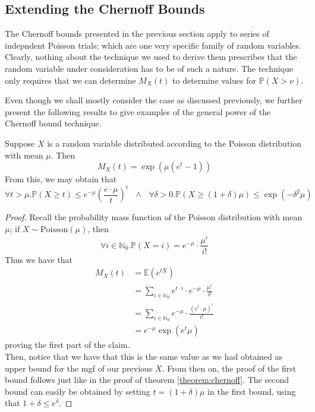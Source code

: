 	\subsection{Extending the Chernoff Bounds}
	The Chernoff bounds presented in the previous section apply to series of indepndent 
	Poisson trials; which are one very specific family of random variables. Clearly, nothing 
	about the technique we used to derive them prescribes that the random variable under 
	consideration has to be of such a nature. The technique only requires that we can 
	determine $M_X(t)$ to determine values for $\mathbb{P}(X > \nu)$. \par
	Even though we shall mostly consider the case as discussed previously, we further present 
	the following results to give examples of the general power of the Chernoff bound 
	technique.
	\begin{claim}
		Suppose $X$ is a random variable distributed according to the Poisson distribution 
		with mean $\mu$. Then 
		$$
			M_X(t) = \exp\left(\mu\left(e^t-1\right)\right)
		$$
		From this, we may obtain that 
		$$
			\forall t > \mu .
			\mathbb{P}(X \geq t) \leq e^{-\mu} \left(\frac{e\cdot\mu}{t}\right)^t 
			\ \ \ \land\ \ \ \forall \delta > 0 .
			\mathbb{P}(X \geq (1+\delta)\mu) \leq \exp(-\delta^2\mu)
		$$
	\end{claim}
	\begin{proof}
		Recall the probability mass function of the Poisson distribution with mean $\mu$;
		if $X \sim \mathrm{Poisson}(\mu)$, then
		$$
			\forall i \in \mathbb{N}_0. 
			\mathbb{P}(X = i) = e^{-\mu} \cdot \frac{\mu^i}{i!}
		$$
		Thus we have that 
		\begin{align*}
			M_X(t) &= \mathbb{E}(e^{tX}) \\
			&= \sum_{i \in \mathbb{N}_0}e^{t\cdot i}\cdot e^{-\mu}\cdot\frac{\mu^i}{i!}
			\\
			&= \sum_{i \in \mathbb{N}_0} e^{-\mu}\cdot\frac{(e^{t}\cdot\mu)^i}{i!} \\
			&= e^{-\mu} \exp(e^t\mu)
		\end{align*}
		proving the first part of the claim. \\
		Then, notice that we have that this is the same value as we had obtained as upper 
		bound for the mgf of our previous $X$. From then on, the proof of the first bound 
		follows just like in the proof of theorem \ref{theorem:chernoff}. The second bound 
		can easily be obtained by setting $t = (1+\delta)\mu$ in the first bound, using 
		that $1+\delta \leq e^\delta$.
	\end{proof}
